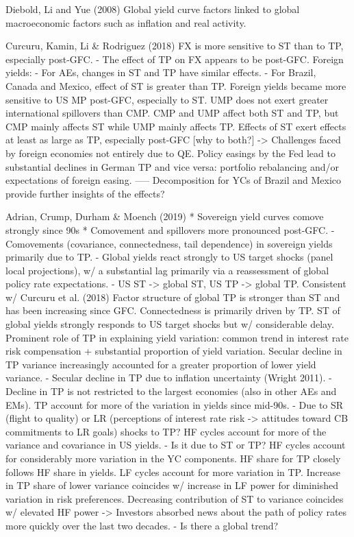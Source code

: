 Diebold, Li and Yue (2008)
Global yield curve factors linked to global macroeconomic factors such as inflation and real activity.

Curcuru, Kamin, Li \& Rodriguez (2018)
FX is more sensitive to ST than to TP, especially post-GFC.
- The effect of TP on FX appears to be post-GFC.
Foreign yields:
- For AEs, changes in ST and TP have similar effects.
- For Brazil, Canada and Mexico, effect of ST is greater than TP.
Foreign yields became more sensitive to US MP post-GFC, especially to ST.
UMP does not exert greater international spillovers than CMP.
CMP and UMP affect both ST and TP, but CMP mainly affects ST while UMP mainly affects TP.
Effects of ST exert effects at least as large as TP, especially post-GFC [why to both?] -> Challenges faced by foreign economies not entirely due to QE.
Policy easings by the Fed lead to substantial declines in German TP and vice versa: portfolio rebalancing and/or expectations of foreign easing.
-----
Decomposition for YCs of Brazil and Mexico provide further insights of the effects?


Adrian, Crump, Durham \& Moench (2019)
* Sovereign yield curves comove strongly since 90s
* Comovement and spillovers more pronounced post-GFC.
- Comovements (covariance, connectedness, tail dependence) in sovereign yields primarily due to TP.
- Global yields react strongly to US target shocks (panel local projections), w/ a substantial lag primarily via a reassessment of global policy rate expectations.
- US ST -> global ST, US TP -> global TP. Consistent w/ Curcuru et al. (2018)
Factor structure of global TP is stronger than ST and has been increasing since GFC.
Connectedness is primarily driven by TP.
ST of global yields strongly responds to US target shocks but w/ considerable delay.
Prominent role of TP in explaining yield variation: common trend in interest rate risk compensation + substantial proportion of yield variation.
Secular decline in TP variance increasingly accounted for a greater proportion of lower yield variance.
- Secular decline in TP due to inflation uncertainty (Wright 2011).
- Decline in TP is not restricted to the largest economies (also in other AEs and EMs).
TP account for more of the variation in yields since mid-90s.
- Due to SR (flight to quality) or LR (perceptions of interest rate risk -> attitudes toward CB commitments to LR goals) shocks to TP?
HF cycles account for more of the variance and covariance in US yields.
- Is it due to ST or TP? HF cycles account for considerably more variation in the YC components. HF share for TP closely follows HF share in yields. LF cycles account for more variation in TP. 
Increase in TP share of lower variance coincides w/ increase in LF power for diminished variation in risk preferences.
Decreasing contribution of ST to variance coincides w/ elevated HF power -> Investors absorbed news about the path of policy rates more quickly over the last two decades.
- Is there a global trend?

